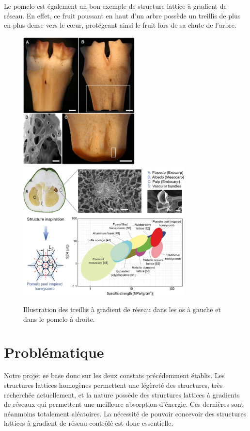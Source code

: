 \documentclass[a4paper]{article}
\begin{document}
	Le pomelo est également un bon exemple de structure lattice à gradient de réseau. En effet, ce fruit poussant en haut d'un arbre possède un treillis de plus en plus dense vers le cœur, protégeant ainsi le fruit lors de sa chute de l'arbre.
	
	\begin{figure}[H]
		\centering
		\includegraphics[height=7cm]{Images/2/os.png}
		\includegraphics[height=7cm]{Images/2/pomelo.jpg}
		\caption{Illustration des treillis à gradient de réseau dans les os \cite{os} à gauche et dans le pomelo \cite{pomelo} à droite.}
	\end{figure}
	\newpage
	
	\section{Problématique}
	\hspace{0.5cm}Notre projet se base donc sur les deux constats précédemment établis. Les structures lattices homogènes permettent une légèreté des structures, très recherchée actuellement, et la nature possède des structures lattices à gradients de réseaux qui permettent une meilleure absorption d’énergie. Ces dernières sont néanmoins totalement aléatoires. La nécessité de pouvoir concevoir des structures lattices à gradient de réseau contrôlé est donc essentielle.\\
	
\end{document}
